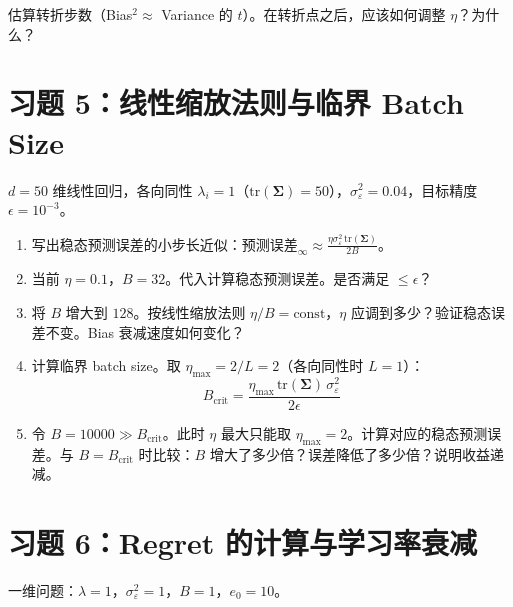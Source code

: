 \documentclass[12pt, a4paper]{ctexart}
\begin{document}
\begin{enumerate}
    估算转折步数（Bias$^2 \approx$ Variance 的 $t$）。在转折点之后，应该如何调整 $\eta$？为什么？
\end{enumerate}


\section*{习题 5：线性缩放法则与临界 Batch Size}

$d = 50$ 维线性回归，各向同性 $\lambda_i = 1$（$\text{tr}(\boldsymbol{\Sigma}) = 50$），$\sigma_\varepsilon^2 = 0.04$，目标精度 $\epsilon = 10^{-3}$。

\begin{enumerate}
    \item[(a)] 写出稳态预测误差的小步长近似：$\text{预测误差}_\infty \approx \frac{\eta\sigma_\varepsilon^2\,\text{tr}(\boldsymbol{\Sigma})}{2B}$。

    \item[(b)] 当前 $\eta = 0.1$，$B = 32$。代入计算稳态预测误差。是否满足 $\leq \epsilon$？
    
    \item[(c)] 将 $B$ 增大到 $128$。按线性缩放法则 $\eta/B = \text{const}$，$\eta$ 应调到多少？验证稳态误差不变。Bias 衰减速度如何变化？
    
    \item[(d)] 计算临界 batch size。取 $\eta_{\max} = 2/L = 2$（各向同性时 $L = 1$）：
    \[
    B_{\text{crit}} = \frac{\eta_{\max}\,\text{tr}(\boldsymbol{\Sigma})\,\sigma_\varepsilon^2}{2\epsilon}
    \]
    
    \item[(e)] 令 $B = 10000 \gg B_{\text{crit}}$。此时 $\eta$ 最大只能取 $\eta_{\max} = 2$。计算对应的稳态预测误差。与 $B = B_{\text{crit}}$ 时比较：$B$ 增大了多少倍？误差降低了多少倍？说明收益递减。
\end{enumerate}


\section*{习题 6：Regret 的计算与学习率衰减}

一维问题：$\lambda = 1$，$\sigma_\varepsilon^2 = 1$，$B = 1$，$e_0 = 10$。
\end{document}
